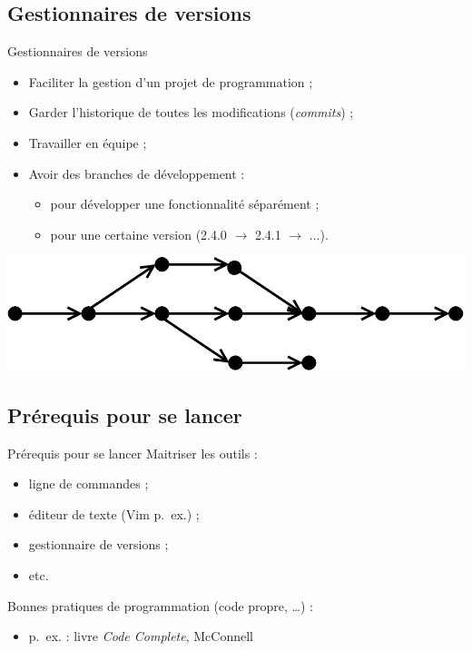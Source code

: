 \documentclass{beamer}
\begin{document}
\subsection{Gestionnaires de versions}
\begin{frame}{Gestionnaires de versions}
  \begin{itemize}
    \item Faciliter la gestion d'un projet de programmation ;
    \item Garder l'historique de toutes les modifications (\textit{commits}) ;
    \item Travailler en équipe ;
    \item Avoir des branches de développement :
      \begin{itemize}
        \item pour développer une fonctionnalité séparément ;
        \item pour une certaine version (2.4.0 $\rightarrow$ 2.4.1 $\rightarrow$ ...).
      \end{itemize}
  \end{itemize}

  \bigskip
  \begin{center}
    \includegraphics[scale=0.4]{images/commit-branch.pdf}
  \end{center}
\end{frame}

\subsection{Prérequis pour se lancer}
\begin{frame}{Prérequis pour se lancer}
  Maitriser les outils :
  \begin{itemize}
    \item ligne de commandes ;
    \item éditeur de texte (Vim p.~ex.) ;
    \item gestionnaire de versions ;
    \item etc.
  \end{itemize}

  \bigskip
  Bonnes pratiques de programmation (code propre, …) :
  \begin{itemize}
    \item p.~ex. : livre \textit{Code Complete}, McConnell
  \end{itemize}
\end{frame}
\end{document}
